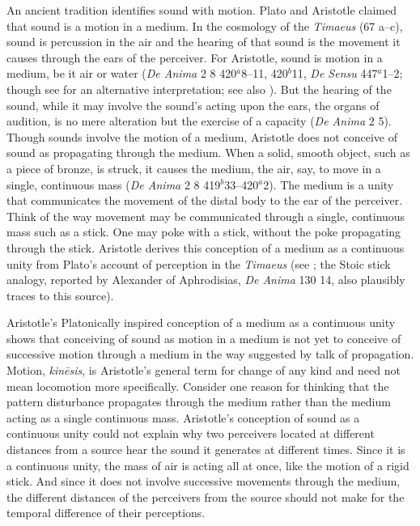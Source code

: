 An ancient tradition identifies sound with motion. Plato and Aristotle claimed that sound is a motion in a medium. In the cosmology of the \emph{Timaeus} (67 a--c), sound is percussion in the air and the hearing of that sound is the movement it causes through the ears of the perceiver. For Aristotle, sound is motion in a medium, be it air or water (\emph{De Anima} 2 8 420\( ^{a} \)8--11, 420\( ^{b} \)11, \emph{De Sensu} 447\( ^{a} \)1--2; though see \citealt[60--1]{OCallaghan:2007xy} for an alternative interpretation; see also \citealt{Johnstone:2013la}). But the hearing of the sound, while it may involve the sound's acting upon the ears, the organs of audition, is no mere alteration but the exercise of a capacity (\emph{De Anima} 2 5). Though sounds involve the motion of a medium, Aristotle does not conceive of sound as propagating through the medium. When a solid, smooth object, such as a piece of bronze, is struck, it causes the medium, the air, say, to move in a single, continuous mass (\emph{De Anima} 2 8 419\( ^{b} \)33--420\( ^{a} \)2). The medium is a unity that communicates the movement of the distal body to the ear of the perceiver. Think of the way movement may be communicated through a single, continuous mass such as a stick. One may poke with a stick, without the poke propagating through the stick. Aristotle derives this conception of a medium as a continuous unity from Plato's account of perception in the \emph{Timaeus} (see \citealt[chapter 1]{Lindberg:1977aa}; the Stoic stick analogy, reported by Alexander of Aphrodisias, \emph{De Anima} 130 14, also plausibly traces to this source). 

Aristotle's Platonically inspired conception of a medium as a continuous unity shows that conceiving of sound as motion in a medium is not yet to conceive of successive motion through a medium in the way suggested by talk of propagation. Motion, \emph{kinēsis}, is Aristotle's general term for change of any kind and need not mean locomotion more specifically. Consider one reason for thinking that the pattern disturbance propagates through the medium rather than the medium acting as a single continuous mass. Aristotle's conception of sound as a continuous unity could not explain why two perceivers located at different distances from a source hear the sound it generates at different times. Since it is a continuous unity, the mass of air is acting all at once, like the motion of a rigid stick. And since it does not involve successive movements through the medium, the different distances of the perceivers from the source should not make for the temporal difference of their perceptions. 

